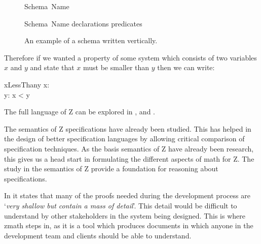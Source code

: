 \begin{figure}[H]
\vspace{-0.2in}
\centering
\begin{minipage}{0.45\textwidth}
\begin{zed}
Schema\ Name 
\end{zed}
\vspace{-0.18in}
\caption{An example of a schema written horizontally.\label{fig:horizontalschema}}
\vspace{-0.2in}
\end{minipage}\hfill
\begin{minipage}{0.45\textwidth}
\begin{schema}{Schema\ Name}
declarations
\where
predicates
\end{schema}
\vspace{-0.2in}
\caption{An example of a schema written vertically. \label{fig:verticalschema}}
\vspace{-0.2in}
\end{minipage}
\end{figure}

Therefore if we wanted a property of some system which consists of two variables $x$ and $y$ and state that $x$ must be smaller than $y$ then we can write:

\begin{schema}{xLessThany}
x: \nat \\
y: \nat
\where
x < y
\end{schema}

The full language of Z can be explored in \cite{spiveyreferencemanual}, \cite{essenceofz} and \cite{Woodcock:1996:UZS:235337}.

The semantics of Z specifications have already been studied. This has helped in the design of better specification languages by allowing critical comparison of specification techniques. As the basis semantics of Z have already been research, this gives us a head start in formulating the different aspects of \gls{math} for Z. The study in the semantics of Z provide a foundation for reasoning about specifications.

In \cite{formsem} it states that many of the proofs needed during the development process are `\textit{very shallow but contain a mass of detail}'. This detail would be difficult to understand by other stakeholders in the system being designed. This is where \gls{zmath} steps in, as it is a tool which produces documents in which anyone in the development team and clients should be able to understand.

